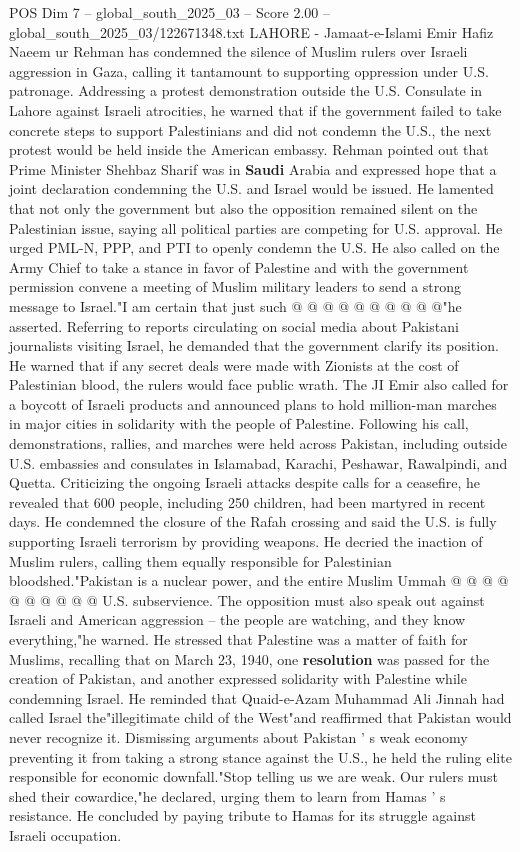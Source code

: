 \begin{textsample}{POS Dim 7 – global\_south\_2025\_03 – Score 2.00 – global\_south\_2025\_03/122671348.txt}  \label{ex:f7_pos_095}
LAHORE - Jamaat-e-Islami Emir Hafiz Naeem ur Rehman has condemned the silence of Muslim rulers over Israeli aggression in Gaza, calling it tantamount to supporting oppression under U.S. patronage.
Addressing a protest demonstration outside the U.S.
Consulate in Lahore against Israeli atrocities, he warned that if the government failed to take concrete steps to support Palestinians and did not condemn the U.S., the next protest would be held inside the American embassy.
Rehman pointed out that Prime Minister Shehbaz Sharif was in \textbf{Saudi} Arabia and expressed hope that a joint declaration condemning the U.S. and Israel would be issued.
He lamented that not only the government but also the opposition remained silent on the Palestinian issue, saying all political parties are competing for U.S. approval.
He urged PML-N, PPP, and PTI to openly condemn the U.S.
He also called on the Army Chief to take a stance in favor of Palestine and with the government permission convene a meeting of Muslim military leaders to send a strong message to Israel."I am certain that just such @ @ @ @ @ @ @ @ @ @"he asserted.
Referring to reports circulating on social media about Pakistani journalists visiting Israel, he demanded that the government clarify its position.
He warned that if any secret deals were made with Zionists at the cost of Palestinian blood, the rulers would face public wrath.
The JI Emir also called for a boycott of Israeli products and announced plans to hold million-man marches in major cities in solidarity with the people of Palestine.
Following his call, demonstrations, rallies, and marches were held across Pakistan, including outside U.S. embassies and consulates in Islamabad, Karachi, Peshawar, Rawalpindi, and Quetta.
Criticizing the ongoing Israeli attacks despite calls for a ceasefire, he revealed that 600 people, including 250 children, had been martyred in recent days.
He condemned the closure of the Rafah crossing and said the U.S. is fully supporting Israeli terrorism by providing weapons.
He decried the inaction of Muslim rulers, calling them equally responsible for Palestinian bloodshed."Pakistan is a nuclear power, and the entire Muslim Ummah @ @ @ @ @ @ @ @ @ @ U.S. subservience.
The opposition must also speak out against Israeli and American aggression -- the people are watching, and they know everything,"he warned.
He stressed that Palestine was a matter of faith for Muslims, recalling that on March 23, 1940, one \textbf{resolution} was passed for the creation of Pakistan, and another expressed solidarity with Palestine while condemning Israel.
He reminded that Quaid-e-Azam Muhammad Ali Jinnah had called Israel the"illegitimate child of the West"and reaffirmed that Pakistan would never recognize it.
Dismissing arguments about Pakistan ' s weak economy preventing it from taking a strong stance against the U.S., he held the ruling elite responsible for economic downfall."Stop telling us we are weak.
Our rulers must shed their cowardice,"he declared, urging them to learn from Hamas ' s resistance.
He concluded by paying tribute to Hamas for its struggle against Israeli occupation.

\end{textsample}

